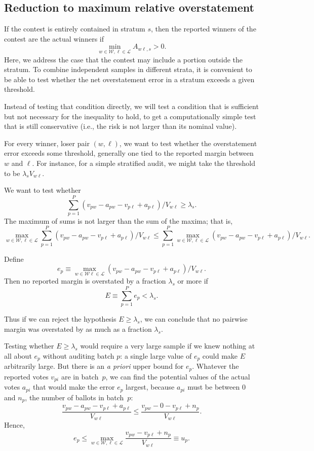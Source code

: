 \subsection{Reduction to maximum relative overstatement}
If the contest is entirely contained in stratum $s$, then
the reported winners of the contest are the actual winners if
$$ 
   \min_{w \in \mathcal{W}, \ell \in \mathcal{L}} A_{w\ell,s} > 0.
$$
Here, we address the case that the contest may include a portion outside the stratum.
To combine independent samples in different strata, it is convenient
to be able to test whether the net overstatement error in a stratum exceeds a given threshold.

Instead of testing that condition directly, we will test a condition that is sufficient 
but not necessary for the inequality to hold, to get a computationally simple test that
is still conservative (i.e., the risk is not larger than its nominal value).

For every winner, loser pair $(w, \ell)$, we want to test
whether the overstatement error exceeds some threshold, generally
one tied to the reported margin between $w$ and $\ell$.
For instance, for a simple stratified audit, we might take the threshold to be
$\lambda_s V_{w\ell}$.

We want to test whether
$$
   \sum_{p=1}^P (v_{pw}-a_{pw} - v_{p\ell} + a_{p\ell})/V_{w\ell} \ge \lambda_s.
$$
The maximum of sums is not larger than the sum of the maxima; that is,
$$
\max_{w \in \mathcal{W},  \ell \in \mathcal{L}}
   \sum_{p=1}^P (v_{pw}-a_{pw} - v_{p\ell} + a_{p\ell})/V_{w\ell}
   \le
  \sum_{p=1}^P  \max_{w \in \mathcal{W},  \ell \in \mathcal{L}} 
  (v_{pw}-a_{pw} - v_{p\ell} + a_{p\ell})/V_{w\ell}.
$$

Define 
$$
  e_p \equiv \max_{w \in \mathcal{W} \ell \in \mathcal{L}} 
     (v_{pw}-a_{pw} - v_{p\ell} + a_{p\ell})/V_{w\ell}.
$$
Then no reported margin is overstated by a fraction $\lambda_s$ or more
if 
$$ 
  E \equiv \sum_{p=1}^P e_p < \lambda_s.
$$

Thus if we can reject the hypothesis $E \ge \lambda_s$, we can conclude that
no pairwise margin was overstated by as much as a fraction $\lambda_s$.

Testing whether $E \ge \lambda_s$ would require a very large sample if we knew nothing at
all about $e_p$ without auditing batch $p$: a single large value of $e_p$ could make
$E$ arbitrarily large.
But there is an \emph{a priori} upper bound for $e_p$.
Whatever the reported votes $v_{pi}$ are in batch~$p$, we can find the
potential values of the actual votes $a_{pi}$ that would make the
error $e_p$ largest, because $a_{pi}$ must be between 0 and $n_p$,
the number of ballots in batch~$p$:
$$
    \frac{v_{pw}-a_{pw} - v_{p\ell} + a_{p\ell}}{V_{w\ell}} \le 
    \frac{v_{pw}- 0 - v_{p\ell} + n_p}{V_{w\ell}}.
$$
Hence,
\begin{equation} \label{eq:uDef}
    e_p \le \max_{w \in \mathcal{W}, \ell \in \mathcal{L}} 
    \frac{v_{pw} - v_{p\ell} + n_p}{V_{w\ell}} \equiv u_p.
\end{equation}

